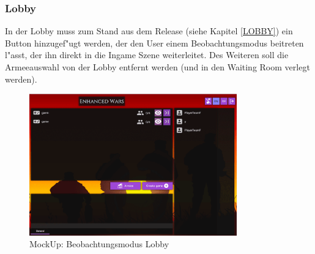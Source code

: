 \documentclass[12pt, titlepage]{scrartcl}
\newcommand{\RN}[1]{%
	\textup{\uppercase\expandafter{\romannumeral#1}}%
}
\begin{document}
	        \subsubsection{Lobby}
	            In der Lobby muss zum Stand aus dem Release \RN{2} (siehe Kapitel \ref{LOBBY}) ein Button hinzugef"ugt werden, der den User einem Beobachtungsmodus beitreten l"asst, der ihn direkt in die Ingame Szene weiterleitet. Des Weiteren soll die Armeeauswahl von der Lobby entfernt werden (und in den Waiting Room verlegt werden). \\
	            \begin{figure}[H] 
    				\centering
    				\includegraphics[width=0.8\textwidth]{images/mockUps/LobbyWatchMode.png}
    				\caption{MockUp: Beobachtungsmodus Lobby}
    				\label{Watch_Mode}
			    \end{figure}
\end{document}
